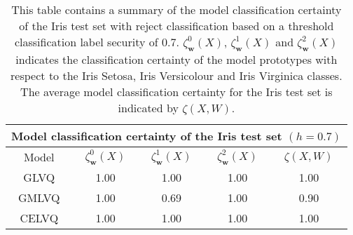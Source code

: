 \begin{table}[H]
	\centering
	\begin{tabular}{ |c|c|c|c|c|  }
		\hline
		\multicolumn{5}{|c|}{Model classification certainty of the Iris test set $(h=0.7)$} \\
		\hline
		Model &$\zeta_{\mathbf{w}}^{0}(X) $   & $\zeta_{\mathbf{w}}^{1}(X)$ &$\zeta_{\mathbf{w}}^{2}(X)$  &$\zeta(X,W)$   \\
		\hline
		GLVQ &1.00   &1.00  &1.00  &1.00  \\
		GMLVQ &1.00  &0.69  &1.00  &0.90   \\
		CELVQ &1.00  &1.00  &1.00 &1.00  \\		
		\hline
	\end{tabular}
	\caption[Summary of model classification certainty of the Iris test set with threshold security]{\label{tab:Iris summary1}This table contains a summary of the model classification certainty of the Iris test set with reject classification based on a threshold classification label security of 0.7.\hspace{2pt} $\zeta_{\mathbf{w}}^{0}(X) $,\hspace{2pt} $\zeta_{\mathbf{w}}^{1}(X)$\hspace{2pt} and\hspace{2pt} $\zeta_{\mathbf{w}}^{2}(X)$\hspace{2pt} indicates the classification certainty of the model prototypes with respect to the Iris Setosa, Iris Versicolour and Iris Virginica classes. The average model classification certainty for the Iris test set is indicated by\hspace{2pt} $\zeta(X,W)$.}
\end{table}

